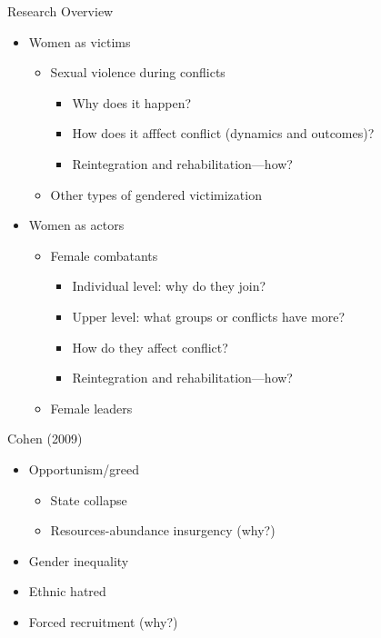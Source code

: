 \documentclass{beamer}
\begin{document}
\begin{frame}{Research Overview}
    \begin{itemize}
        \pause\item Women as victims
        \begin{itemize}
            \pause\item Sexual violence during conflicts
            \begin{itemize}
                \pause\item Why does it happen?
                \pause\item How does it afffect conflict (dynamics and outcomes)?
                \pause\item Reintegration and rehabilitation---how?
            \end{itemize}
            \pause\item Other types of gendered victimization
        \end{itemize}
        \pause\item Women as actors
        \begin{itemize}
            \pause\item Female combatants
            \begin{itemize}
                \pause\item Individual level: why do they join?
                \pause\item Upper level: what groups or conflicts have more?
                \pause\item How do they affect conflict?
                \pause\item Reintegration and rehabilitation---how?
            \end{itemize}
            \pause\item Female leaders
        \end{itemize}
    \end{itemize}
\end{frame}

\begin{frame}{Cohen (2009)}
    \begin{itemize}
        \pause\item Opportunism/greed
        \begin{itemize}
            \pause\item State collapse
            \pause\item Resources-abundance insurgency (why?)
        \end{itemize}
        \pause\item Gender inequality
        \pause\item Ethnic hatred
        \pause\item Forced recruitment (why?)
    \end{itemize}
\end{frame}
\end{document}
